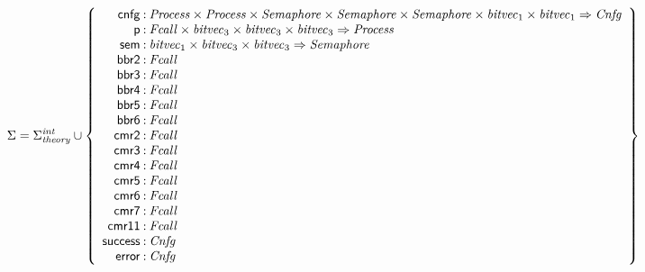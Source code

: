 \documentclass[a4paper]{article}
\def\lthtmlcheckvsize{\ifdim\ht\sizebox<\vsize 
  \ifdim\wd\sizebox<\hsize\expandafter\hfill\fi \expandafter\vfill
  \else\expandafter\vss\fi}%
\begin{document}
{\newpage\clearpage
{}%
$\displaystyle \Sigma = 
\Sigma^{\mathit{int}}_{\mathit{theory}}\cup\left\{
\begin{array}{r@{\>}c@{\>}l}
\mathsf{cnfg} & : & \mathit{Process} \times \mathit{Process} \times \mathit{Semaphore} \times \mathit{Semaphore} \times \mathit{Semaphore} \times \mathit{bitvec}_{1} \times \mathit{bitvec}_{1} \Rightarrow \mathit{Cnfg}\\
\mathsf{p} & : & \mathit{Fcall} \times \mathit{bitvec}_{3} \times \mathit{bitvec}_{3} \times \mathit{bitvec}_{3} \Rightarrow \mathit{Process}\\
\mathsf{sem} & : & \mathit{bitvec}_{1} \times \mathit{bitvec}_{3} \times \mathit{bitvec}_{3} \Rightarrow \mathit{Semaphore}\\
\mathsf{bbr2} & : & \mathit{Fcall}\\
\mathsf{bbr3} & : & \mathit{Fcall}\\
\mathsf{bbr4} & : & \mathit{Fcall}\\
\mathsf{bbr5} & : & \mathit{Fcall}\\
\mathsf{bbr6} & : & \mathit{Fcall}\\
\mathsf{cmr2} & : & \mathit{Fcall}\\
\mathsf{cmr3} & : & \mathit{Fcall}\\
\mathsf{cmr4} & : & \mathit{Fcall}\\
\mathsf{cmr5} & : & \mathit{Fcall}\\
\mathsf{cmr6} & : & \mathit{Fcall}\\
\mathsf{cmr7} & : & \mathit{Fcall}\\
\mathsf{cmr11} & : & \mathit{Fcall}\\
\mathsf{success} & : & \mathit{Cnfg}\\
\mathsf{error} & : & \mathit{Cnfg}\\
\end{array}
\right\}
$%
\lthtmlindisplaymathZ
\lthtmlcheckvsize\clearpage}
\end{document}
